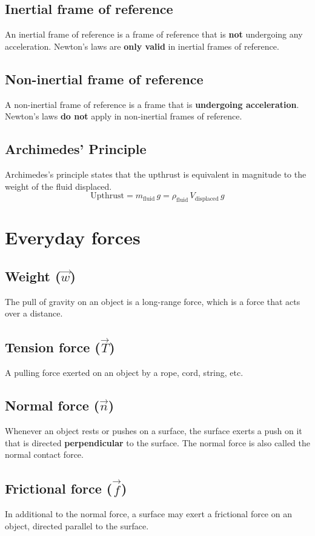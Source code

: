\documentclass[11pt]{article}
\begin{document}
\subsection{Inertial frame of reference}
\label{sec:orgb3e7066}
An inertial frame of reference is a frame of reference that is \textbf{not} undergoing any acceleration. Newton's laws are \textbf{only valid} in inertial frames of reference.
\subsection{Non-inertial frame of reference}
\label{sec:org8c5a657}
A non-inertial frame of reference is a frame that is \textbf{undergoing acceleration}. Newton's laws \textbf{do not} apply in non-inertial frames of reference.
\subsection{Archimedes' Principle}
\label{sec:orgd299070}
Archimedes's principle states that the upthrust is equivalent in magnitude to the weight of the fluid displaced.
\[\text{Upthrust} = m_{\text{fluid}} \, g = \rho_{\text{fluid}} \, V_{\text{displaced}} \, g\]
\section{Everyday forces}
\label{sec:org7ba71b1}

\subsection{Weight (\(\vec{w}\))}
\label{sec:org391aa33}
The pull of gravity on an object is a long-range force, which is a force that acts over a distance.
\subsection{Tension force (\(\vec{T}\))}
\label{sec:orge6e2e79}
A pulling force exerted on an object by a rope, cord, string, etc.
\subsection{Normal force (\(\vec{n}\))}
\label{sec:org2612b06}
Whenever an object rests or pushes on a surface, the surface exerts a push on it that is directed \textbf{perpendicular} to the surface. The normal force is also called the normal contact force.
\subsection{Frictional force (\(\vec{f}\))}
\label{sec:org913c51c}
In additional to the normal force, a surface may exert a frictional force on an object, directed parallel to the surface.
\end{document}
